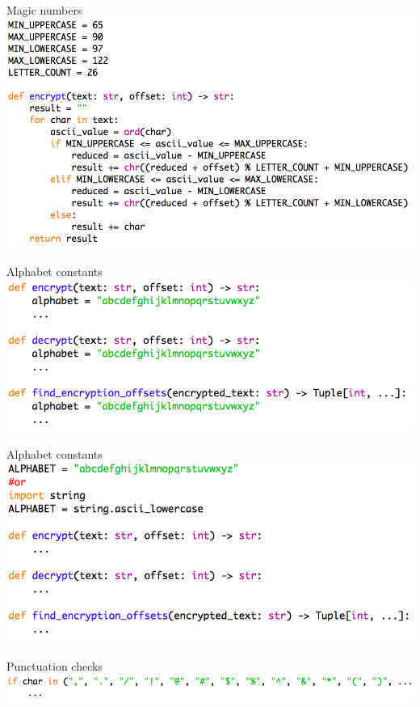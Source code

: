 \documentclass[week2]{csse1001}
\begin{document}
\begin{topic}{Magic numbers}
\includegraphics[width=\textwidth]{a1pitfalls/constants}
\end{topic}

\begin{topic}{Alphabet constants}
\includegraphics[width=\textwidth]{a1pitfalls/alphabad}
\end{topic}

\begin{topic}{Alphabet constants}
\includegraphics[width=\textwidth]{a1pitfalls/alphagood}
\end{topic}

\begin{topic}{Punctuation checks}
\includegraphics[width=\textwidth]{a1pitfalls/punctubad}
\end{topic}
\end{document}
